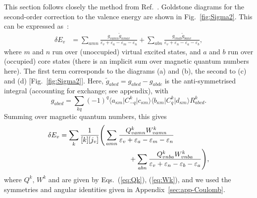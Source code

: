 \documentclass[10pt,twocolumn,a4paper]{article}%
\newcommand{\bra}[1]{\ensuremath{\langle #1|}}	%
\newcommand{\ket}[1]{\ensuremath{|#1\rangle}}	%
\newcommand{\be}{\begin{equation}}
\newcommand{\ee}{\end{equation}}
\def\en{\ensuremath{\varepsilon}}
\renewcommand{\k}{\ensuremath{\kappa}}
\begin{document}
This section follows closely the method from Ref.~\cite{DzubaHFS1984}.
Goldstone diagrams for the second-order correction to the valence energy are shown in Fig.~\ref{fig:Sigma2}.
This can be expressed as~\cite{DzubaHFS1984,JohnsonBook2007}:
\begin{align}\label{eq:dE-SO}
\delta E_v &=
\sum_{amn}
\frac{g_{vamn}\widetilde g_{nmav}}{\en_v+\en_a - \en_m-\en_n}
+\sum_{abn}
 \frac{g_{vnab}\widetilde g_{banv}}{\en_v+\en_n-\en_a-\en_b}  ,
\end{align}
where $m$ and $n$ run over (unoccupied) virtual excited states, and $a$ and $b$ run over (occupied) core states (there is an implicit sum over magnetic quantum numbers here).
The first term corresponds to the diagrams (a) and (b), the second to (c) and (d) [Fig.~\ref{fig:Sigma2}].
Here,
$ \widetilde g_{abcd} =  g_{abcd} -  g_{abdc}$
is the anti-symmetrised integral (accounting for exchange; see appendix), with
\be
 g_{abcd} = \sum_{kq} (-1)^q \bra{a_{\k m}}C^k_{-q}\ket{c_{\k m}} \bra{b_{\k m}}C^k_{q}\ket{d_{\k m}} R^k_{abcd}.
\ee
Summing over magnetic quantum numbers, this gives~\cite{DzubaHFS1984}
\begin{align}\label{eq:dE-SO}
\delta E_v &=\sum_k \frac{1}{[k][j_v]}\Bigg(
 \sum_{amn} \frac{Q^k_{vamn}W^k_{vamn}}{\en_v+\en_a - \en_m-\en_n}
\notag\\&\qquad\qquad\qquad\qquad\qquad
+\sum_{abn}\frac{Q^k_{vnba}W^k_{vnba}}{\en_v+\en_n-\en_b-\en_a}
 \Bigg),
\end{align}
where $Q^k,\,W^k$ and are given by Eqs.~(\ref{eq:Qk}), (\ref{eq:Wk}), and
we used the symmetries and angular identities given in Appendix~\ref{sec:app-Coulomb}.
\end{document}
